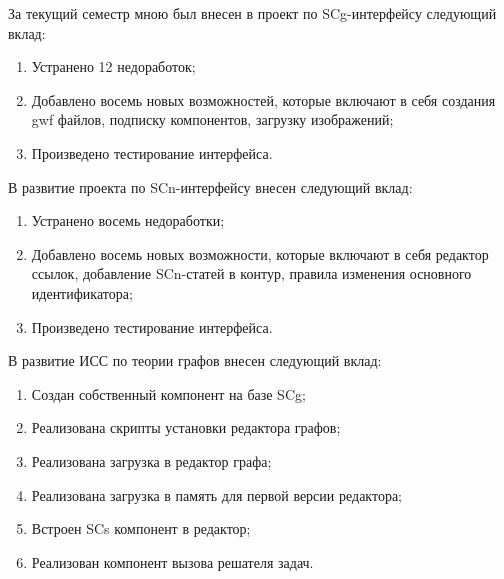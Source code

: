 
За текущий семестр мною был внесен в проект по SCg-интерфейсу следующий вклад:
\begin{enumerate}
\item{Устранено 12 недоработок;}
\item{Добавлено восемь новых возможностей, которые включают в себя создания gwf файлов, подписку компонентов, загрузку изображений;}
\item{Произведено тестирование интерфейса.}
\end{enumerate}

В развитие проекта по SCn-интерфейсу внесен следующий вклад:
\begin{enumerate}
\item{Устранено восемь недоработки;}
\item{Добавлено восемь новых возможности, которые включают в себя редактор ссылок, добавление SCn-статей в контур, правила изменения основного идентификатора;}
\item{Произведено тестирование интерфейса.}
\end{enumerate}


В развитие ИСС по теории графов внесен следующий вклад:
\begin{enumerate}
\item{Создан собственный компонент на базе SCg;}
\item{Реализована скрипты установки редактора графов;}
\item{Реализована загрузка в редактор графа;}
\item{Реализована загрузка в память для первой версии редактора;}
\item{Встроен SCs компонент в редактор;}
\item{Реализован компонент вызова решателя задач.}
\end{enumerate}
